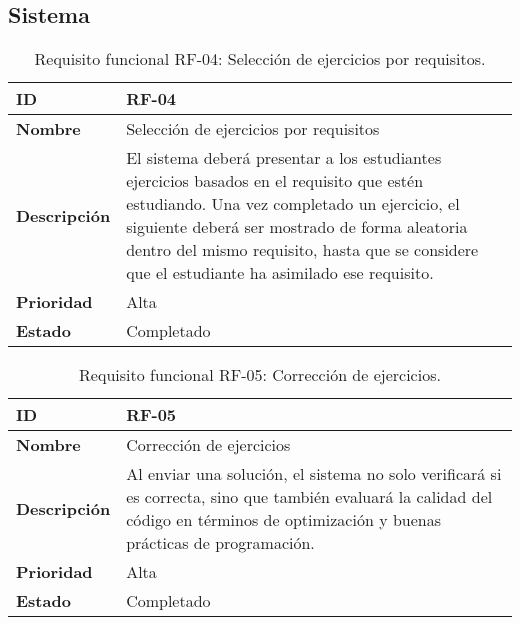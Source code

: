 \subsection{Sistema}
        
\begin{table}[H]
    \centering
    \begin{tabular}{|l|p{9.5cm}|}
        \hline
        \textbf{ID} & RF-04 \\
        \hline
        \textbf{Nombre} & Selección de ejercicios por requisitos \\
        \hline
        \textbf{Descripción} & El sistema deberá presentar a los estudiantes ejercicios basados en el requisito que estén estudiando. Una vez completado un ejercicio, el siguiente deberá ser mostrado de forma aleatoria dentro del mismo requisito, hasta que se considere que el estudiante ha asimilado ese requisito. \\
        \hline
        \textbf{Prioridad} & Alta \\
        \hline   
        \textbf{Estado} & Completado \\
        \hline
    \end{tabular}
    \caption{Requisito funcional RF-04: Selección de ejercicios por requisitos.}
    \label{table:req-RF003}
\end{table}

\begin{table}[H]
    \centering
    \begin{tabular}{|l|p{9.5cm}|}
        \hline
        \textbf{ID} & RF-05 \\
        \hline
        \textbf{Nombre} & Corrección de ejercicios \\
        \hline
        \textbf{Descripción} & Al enviar una solución, el sistema no solo verificará si es correcta, sino que también evaluará la calidad del código en términos de optimización y buenas prácticas de programación. \\
        \hline
        \textbf{Prioridad} & Alta \\
        \hline
        \textbf{Estado} & Completado \\
        \hline
    \end{tabular}
    \caption{Requisito funcional RF-05: Corrección de ejercicios.}
    \label{table:req-RF004}
\end{table}
        
